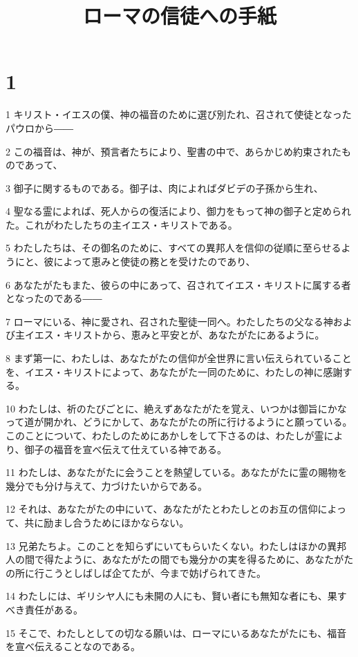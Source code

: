 

\title{ローマの信徒への手紙}


\chapter{1}

\par 1 キリスト・イエスの僕、神の福音のために選び別たれ、召されて使徒となったパウロから――
\par 2 この福音は、神が、預言者たちにより、聖書の中で、あらかじめ約束されたものであって、
\par 3 御子に関するものである。御子は、肉によればダビデの子孫から生れ、
\par 4 聖なる霊によれば、死人からの復活により、御力をもって神の御子と定められた。これがわたしたちの主イエス・キリストである。
\par 5 わたしたちは、その御名のために、すべての異邦人を信仰の従順に至らせるようにと、彼によって恵みと使徒の務とを受けたのであり、
\par 6 あなたがたもまた、彼らの中にあって、召されてイエス・キリストに属する者となったのである――
\par 7 ローマにいる、神に愛され、召された聖徒一同へ。わたしたちの父なる神および主イエス・キリストから、恵みと平安とが、あなたがたにあるように。
\par 8 まず第一に、わたしは、あなたがたの信仰が全世界に言い伝えられていることを、イエス・キリストによって、あなたがた一同のために、わたしの神に感謝する。
\par 10 わたしは、祈のたびごとに、絶えずあなたがたを覚え、いつかは御旨にかなって道が開かれ、どうにかして、あなたがたの所に行けるようにと願っている。このことについて、わたしのためにあかしをして下さるのは、わたしが霊により、御子の福音を宣べ伝えて仕えている神である。
\par 11 わたしは、あなたがたに会うことを熱望している。あなたがたに霊の賜物を幾分でも分け与えて、力づけたいからである。
\par 12 それは、あなたがたの中にいて、あなたがたとわたしとのお互の信仰によって、共に励まし合うためにほかならない。
\par 13 兄弟たちよ。このことを知らずにいてもらいたくない。わたしはほかの異邦人の間で得たように、あなたがたの間でも幾分かの実を得るために、あなたがたの所に行こうとしばしば企てたが、今まで妨げられてきた。
\par 14 わたしには、ギリシヤ人にも未開の人にも、賢い者にも無知な者にも、果すべき責任がある。
\par 15 そこで、わたしとしての切なる願いは、ローマにいるあなたがたにも、福音を宣べ伝えることなのである。
